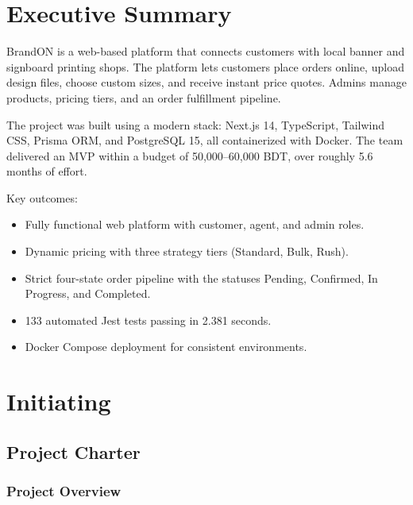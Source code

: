 \documentclass[12pt,a4paper]{report}
\begin{document}
\chapter*{Executive Summary}

BrandON is a web-based platform that connects customers with local banner and signboard printing shops. The platform lets customers place orders online, upload design files, choose custom sizes, and receive instant price quotes. Admins manage products, pricing tiers, and an order fulfillment pipeline.

The project was built using a modern stack: Next.js 14, TypeScript, Tailwind CSS, Prisma ORM, and PostgreSQL 15, all containerized with Docker. The team delivered an MVP within a budget of 50,000--60,000 BDT, over roughly 5.6 months of effort.

Key outcomes:
\begin{itemize}
  \item Fully functional web platform with customer, agent, and admin roles.
  \item Dynamic pricing with three strategy tiers (Standard, Bulk, Rush).
  \item Strict four-state order pipeline with the statuses Pending, Confirmed, In Progress, and Completed.
  \item 133 automated Jest tests passing in 2.381 seconds.
  \item Docker Compose deployment for consistent environments.
\end{itemize}

\chapter{Initiating}

\section{Project Charter}

\subsection{Project Overview}
\end{document}
